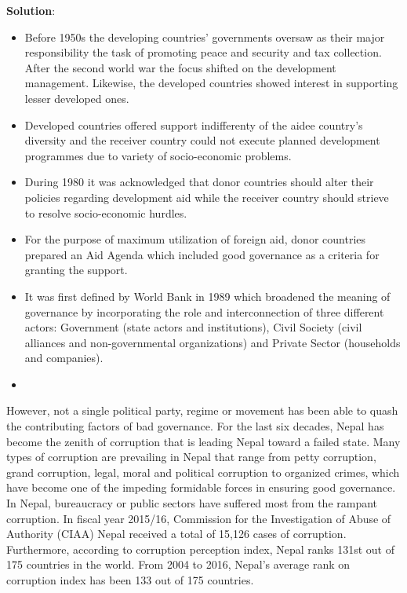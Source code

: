 \documentclass[
]{book}
\newenvironment{solution}{ {\bfseries Solution}:}{}
\begin{document}
\begin{questions}
\begin{solution}
\begin{itemize}
\item Before 1950s the developing countries' governments oversaw as their major responsibility the task of promoting peace and security and tax collection. After the second world war the focus shifted on the development management. Likewise, the developed countries showed interest in supporting lesser developed ones.
\item Developed countries offered support indifferenty of the aidee country's diversity and the receiver country could not execute planned development programmes due to variety of socio-economic problems.
\item During 1980 it was acknowledged that donor countries should alter their policies regarding development aid while the receiver country should strieve to resolve socio-economic hurdles.
\item For the purpose of maximum utilization of foreign aid, donor countries prepared an Aid Agenda which included good governance as a criteria for granting the support.
\item It was first defined by World Bank in 1989 which broadened the meaning of governance by incorporating the role and interconnection of three different actors: Government (state actors and institutions), Civil Society (civil alliances and non-governmental organizations) and Private Sector (households and companies).
\item 
\end{itemize}

However, not a single political party, regime or movement has been able to quash the contributing factors of bad governance. For the last six decades, Nepal has become the zenith of corruption that is leading Nepal toward a failed state. Many types of corruption are prevailing in Nepal that range from petty corruption, grand corruption, legal, moral and political corruption to organized crimes, which have become one of the impeding formidable forces in ensuring good governance. In Nepal, bureaucracy or public sectors have suffered most from the rampant corruption. In fiscal year 2015/16, Commission for the Investigation of Abuse of Authority (CIAA) Nepal received a total of 15,126 cases of corruption.  Furthermore, according to corruption perception index, Nepal ranks 131st out of 175 countries in the world. From 2004 to 2016, Nepal’s average rank on corruption index has been 133 out of 175 countries.

\end{solution}


\end{questions}
\end{document}
